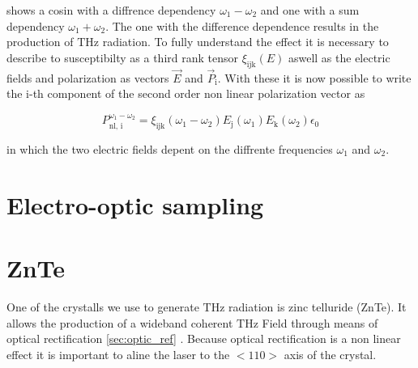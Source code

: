 shows a cosin with a diffrence dependency $\omega_1-\omega_2$ and one with a sum dependency $\omega_1+\omega_2$.
The one with the difference dependence results in the production of $\si{\tera\hertz}$ radiation. %
To fully understand the effect it is necessary to describe to susceptibilty as a third rank tensor $\xi_\text{ijk}(E)$ aswell as the electric fields and polarization as vectors $\vec{E}$ and $\vec{P}_\text{i}$.
With these it is now possible to write the $\text{i}$-th component of the second order non linear polarization vector as 

\begin{equation}
    P_\text{nl, i}^{\omega_1 - \omega_2} = \xi_\text{ijk}(\omega_1-\omega_2)E_\text{j}(\omega_1)E_\text{k}(\omega_2)\epsilon_0
    \label{eq:polarization_tensor_sus}
\end{equation}

in which the two electric fields depent on the diffrente frequencies $\omega_1$ and $\omega_2$.
% 

\cite[289--291]{book_optical_rectification}

\section{Electro-optic sampling}\label{sec:eos}


\section{ZnTe}
One of the crystalls we use to generate $\si{\tera\hertz}$ radiation is zinc telluride (ZnTe). 
It allows the production of a wideband coherent $\si{\tera\hertz}$ Field through means of optical rectification \ref{sec:optic_ref} \cite{ZnTe_Nahata_Weling_1996}.
Because optical rectification is a non linear effect it is important to aline the laser to the $<110>$ axis of the crystal.


